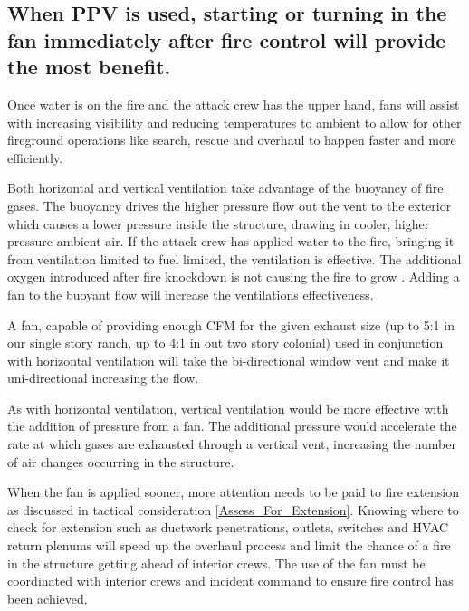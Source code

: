\documentclass{article}
\begin{document}
\subsection{When PPV is used, starting or turning in the fan immediately after fire control will provide the most benefit.}  
Once water is on the fire and the attack crew has the upper hand, fans will assist with increasing visibility and reducing temperatures to ambient to allow for other fireground operations like search, rescue and overhaul to happen faster and more efficiently.  

Both horizontal and vertical ventilation take advantage of the buoyancy of fire gases. The buoyancy drives the higher pressure flow out the vent to the exterior which causes a lower pressure inside the structure, drawing in cooler, higher pressure ambient air. If the attack crew has applied water to the fire, bringing it from ventilation limited to fuel limited, the ventilation is effective. The additional oxygen introduced after fire knockdown is not causing the fire to grow \cite{DHS2008} \cite{DHS2010}. Adding a fan to the buoyant flow will increase the ventilations effectiveness. 

A fan, capable of providing enough CFM for the given exhaust size (up to 5:1 in our single story ranch, up to 4:1 in out two story colonial) used in conjunction with horizontal ventilation will take the bi-directional window vent and make it uni-directional increasing the flow.

As with horizontal ventilation, vertical ventilation would be more effective with the addition of pressure from a fan. The additional pressure would accelerate the rate at which gases are exhausted through a vertical vent, increasing the number of air changes occurring in the structure.

When the fan is applied sooner, more attention needs to be paid to fire extension as discussed in tactical consideration \ref{Assess_For_Extension}. Knowing where to check for extension such as ductwork penetrations, outlets, switches and HVAC return plenums will speed up the overhaul process and limit the chance of a fire in the structure getting ahead of interior crews.  The use of the fan must be coordinated with interior crews and incident command to ensure fire control has been achieved.  

\newpage

\glsaddall
\printglossary[nonumberlist]
\newpage

\printbibliography


\begin{appendices}
	
\end{appendices}
\end{document}
